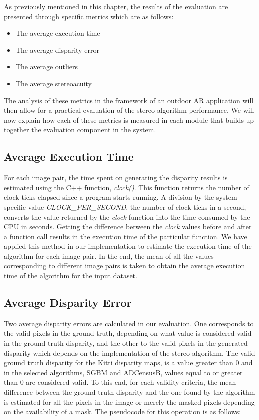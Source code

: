 As previously mentioned in this chapter, the results of the evaluation are presented through specific metrics which are as follows:

\begin{itemize}
\item{The average execution time}
\item{The average disparity error}
\item{The average outliers}
\item{The average stereoacuity}
\end{itemize}

The analysis of these metrics in the framework of an outdoor AR application will then allow for a practical evaluation of the stereo algorithm performance.
We will now explain how each of these metrics is measured in each module that builds up together the evaluation component in the system.

\subsection{Average Execution Time}
For each image pair, the time spent on generating the disparity results is estimated using the C++ function, \textit{clock()}. 
This function returns the number of clock ticks elapsed
since a program starts running. A division by the system-specific value \textit{CLOCK\_PER\_SECOND}, the number of clock ticks in a second, 
converts the value returned by the \textit{clock} function into the time consumed by the CPU in seconds.
Getting the difference between the \textit{clock} values before and after a function call results in the execution time
of the particular function. 
We have applied this method in our implementation to estimate the execution time of the algorithm for each image pair. In the end, the mean of all
the values corresponding to different image pairs is taken to obtain the average execution time of the algorithm for the input dataset.

\subsection{Average Disparity Error}
Two average disparity errors are calculated in our evaluation. One corresponds to the valid pixels in the ground truth, depending on what value is considered valid
in the ground truth disparity, and the other to
the valid pixels in the generated disparity which depends on the implementation of the stereo algorithm.
The valid ground truth disparity for the Kitti disparity maps, is a value greater than 0 and in the selected algorithms, SGBM and ADCensusB, 
values equal to or greater than 0 are considered valid.
To this end, for each validity criteria, the mean difference between the ground truth disparity and the one found by the algorithm
is estimated for all the pixels in the image or merely the masked pixels depending on the availability of a mask. 
The pseudocode for this operation is as follows:

